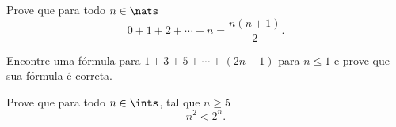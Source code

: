 \begin{exercise}
\label{sum_up_to_n}
%
Prove que para todo $n \in\nats$
$$
0 + 1 + 2 + \dotsb + n = \frac {n(n+1)} 2.
$$
\end{exercise}

\begin{exercise}
%
Encontre uma fórmula para $1 + 3 + 5 + \dotsb + (2n - 1)$ para $n \leq 1$ e prove que sua fórmula é correta.
\end{exercise}

\begin{exercise}
%
Prove que para todo $n \in\ints$, tal que $n \geq 5$
$$
n^2 < 2^n.
$$
\end{exercise}

